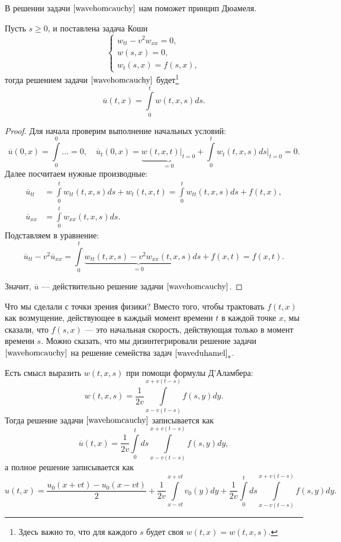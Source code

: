 В решении задачи $\eqref{wavehomcauchy}$ нам поможет принцип Дюамеля.
\begin{theorem}[Дюамель] Пусть $s \geq 0$, и поставлена задача Коши
\begin{equation}
	\begin{cases}
		w_{tt} - v^2 w_{xx} = 0, \\
		w(s,x) = 0, \\
		w_t(s,x) = f(s,x),
	\end{cases}
\label{waveduhamel}
\end{equation}
тогда решением задачи $\eqref{wavehomcauchy}$ будет\footnote{Здесь важно то, что для каждого $s$ будет своя $w(t,x) = w(t,x,s)$.}
$$ \overline{u}(t,x) = \int \limits_0^t w(t,x,s) ds.$$
\end{theorem}
\begin{proof}
Для начала проверим выполнение начальных условий:
$$\overline{u} (0,x) = \int \limits_0^0 ... = 0, \quad \overline{u}_t (0,x) = \underbrace {w(t,x,t) \Bigg\rvert_{t=0}}_{= 0} + \int \limits_0^t w_t(t,x,s)ds \Bigg\rvert_{t=0} = 0.$$
Далее посчитаем нужные производные:
\begin{align*}
	\overline{u}_{tt} &= \int \limits_0^t w_{tt} (t,x,s) ds + w_t (t, x, t) = \int \limits_0^t w_{tt} (t,x,s)ds + f(t,x), \\
	\overline{u}_{xx} &= \int \limits_0^t w_{xx} (t,x,s) ds.
\end{align*}
Подставляем в уравнение:
$$ \overline{u}_{tt} - v^2 \overline{u}_{xx} = \int \limits_0^t \underbrace{w_{tt}(t,x,s) - v^2 w_{xx}(t,x,s)}_{= 0} ds + f(x,t) = f(x,t).$$

Значит, $\overline{u}$ --- действительно решение задачи $\eqref{wavehomcauchy}$.

\end{proof}
Что мы сделали с точки зрения физики? Вместо того, чтобы трактовать $f(t,x)$ как возмущение, действующее в каждый момент времени $t$ в каждой точке $x$, мы сказали, что $f(s,x)$ --- это начальная скорость, действующая только в момент времени $s$. Можно сказать, что мы дизинтегрировали решение задачи $\eqref{wavehomcauchy}$ на решение семейства задач $\eqref{waveduhamel}_s$.

Есть смысл выразить $w(t,x,s)$ при помощи формулы Д'Аламбера:
$$ w(t,x,s) = \frac {1} {2v} \int \limits_{x-v(t-s)}^{x+v(t-s)} f(s,y) dy. $$
Тогда решение задачи  $\eqref{wavehomcauchy}$ записывается как
$$ \overline{u} (t,x) = \frac {1} {2v} \int \limits_0^t ds \int \limits_{x-v(t-s)}^{x+v(t-s)} f(s,y) dy,$$
а полное решение записывается как $$u(t,x) = \frac {u_0 (x+vt) - u_0 (x-vt)} {2} + \frac {1} {2v} \int \limits_{x-vt}^{x+vt} v_0(y)dy + \frac {1} {2v} \int \limits_0^t ds \int \limits_{x-v(t-s)}^{x+v(t-s)} f(s,y) dy.$$


